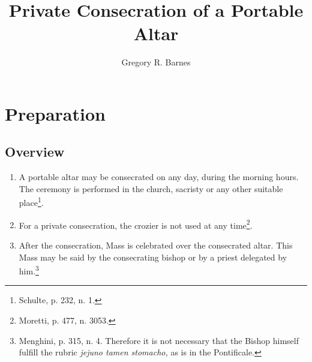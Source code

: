 \documentclass[letterpaper, twocolumn]{article}
\title{Private Consecration of a Portable Altar}
\author{Gregory R. Barnes}
\begin{document}
	\maketitle
\section*{Preparation}
\subsection*{Overview}
\begin{enumerate}
	\item A portable altar may be consecrated on any day, during the morning hours. The ceremony is performed in the church, sacristy or any other suitable place\footnote{Schulte, p. 232, n. 1.}.
	\item For a private consecration, the crozier is not used at any time\footnote{Moretti, p. 477, n. 3053.}.
	\item After the consecration, Mass is celebrated over the  consecrated altar. This Mass may be said by the consecrating bishop or by a priest delegated by him.\footnote{Menghini, p. 315, n. 4. Therefore it is not necessary that the Bishop himself fulfill the rubric \textit{jejuno tamen stomacho,} as is in the Pontificale.}
\end{enumerate}
\end{document}
